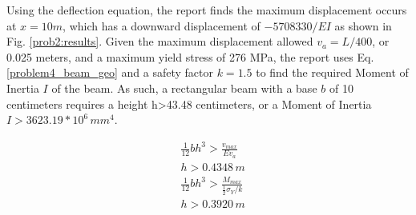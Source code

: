 \documentclass[a4paper]{article}
\begin{document}
Using the deflection equation, the report finds the maximum displacement occurs at $x = 10 m$, which has a downward displacement of $-5708330/EI$ as shown in Fig. \ref{prob2:results}. Given the maximum displacement allowed $v_a = L/400$, or 0.025 meters, and a maximum yield stress of 276 MPa, the report uses Eq. \ref{problem4_beam_geo} and a safety factor $k=1.5$ to find the required Moment of Inertia $I$ of the beam. As such, a rectangular beam with a base $b$ of 10 centimeters requires a height h>43.48 centimeters, or a Moment of Inertia $I > 3623.19 * 10^6\,{mm}^4$.


\begin{equation}
\begin{split}
& \frac{1}{12}bh^3 > \frac{v_{max}}{Ev_a} \\
& h > 0.4348\,m \\
& \frac{1}{12}bh^3 > \frac{M_{max}}{\frac{1}{2}\sigma_Y/ k}\\
& h > 0.3920\,m \\
\end{split}
\label{problem4_beam_geo}
\end{equation}
\end{document}
